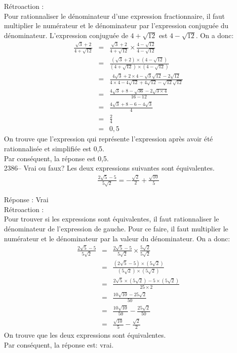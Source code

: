 \documentclass[letterpaper, 12pt]{article}
\begin{document}
R\'etroaction :\\
Pour rationnaliser le d\'enominateur d'une expression fractionnaire, il faut multiplier le num\'erateur et le d\'enominateur par l'expression conjugu\'ee du d\'enominateur. L'expression conjugu\'ee de $4+\sqrt{12}$ est $4-\sqrt{12}$. On a donc:
\begin{eqnarray*}
\frac{\sqrt{3}+2}{4+\sqrt{12}}&=&\frac{\sqrt{3}+2}{4+\sqrt{12}}\times\frac{4-\sqrt{12}}{4-\sqrt{12}}\\[2mm]
&=&\frac{(\sqrt{3}+2)\times(4-\sqrt{12})}{(4+\sqrt{12})\times(4-\sqrt{12})}\\[2mm]
&=&\frac{4\sqrt{3}+2\times4-\sqrt{3}\sqrt{12}-2\sqrt{12}}{4\times4-4\sqrt{12}+4\sqrt{12}-\sqrt{12}\sqrt{12}}\\[2mm]
&=&\frac{4\sqrt{3}+8-\sqrt{36}-2\sqrt{3\times4}}{16-12}\\[2mm]
&=&\frac{4\sqrt{3}+8-6-4\sqrt{3}}{4}\\[2mm]
&=&\frac{2}{4}\\[2mm]
&=&0,5
\end{eqnarray*}
On trouve que l'expression qui repr\'esente l'expression apr\`es avoir \'et\'e rationnalis\'ee et simplifi\'ee est 0,5.\\
Par cons\'equent, la r\'eponse est 0,5.\\

2386-- Vrai ou faux? Les deux expressions suivantes sont \'equivalentes.
\begin{eqnarray*}
\frac{2\sqrt{5}-5}{5\sqrt{2}}=-\frac{\sqrt{2}}{2}+\frac{\sqrt{10}}{5}
\end{eqnarray*}

R\'eponse : Vrai\\

R\'etroaction :\\
Pour trouver si les expressions sont \'equivalentes, il faut rationnaliser le d\'enominateur de l'expression de gauche. Pour ce faire, il faut multiplier le num\'erateur et le d\'enominateur par la valeur du d\'enominateur. On a donc:
\begin{eqnarray*}
\frac{2\sqrt{5}-5}{5\sqrt{2}}&=&\frac{2\sqrt{5}-5}{5\sqrt{2}}\times\frac{5\sqrt{2}}{5\sqrt{2}}\\[2mm]
&=&\frac{(2\sqrt{5}-5)\times(5\sqrt{2})}{(5\sqrt{2})\times(5\sqrt{2})}\\[2mm]
&=&\frac{2\sqrt{5}\times(5\sqrt{2})-5\times(5\sqrt{2})}{25\times2}\\[2mm]
&=&\frac{10\sqrt{10}-25\sqrt{2}}{50}\\[2mm]
&=&\frac{10\sqrt{10}}{50}-\frac{25\sqrt{2}}{50}\\[2mm]
&=&\frac{\sqrt{10}}{5}-\frac{\sqrt{2}}{2}
\end{eqnarray*}
On trouve que les deux expressions sont \'equivalentes.\\
Par cons\'equent, la r\'eponse est: vrai.\\
\end{document}

